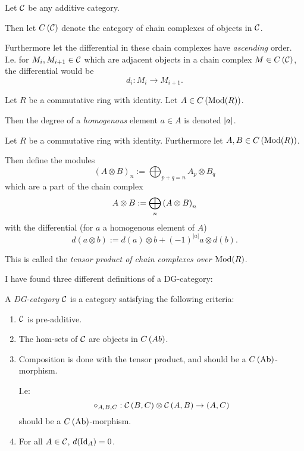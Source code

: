 \begin{notation}
    Let \( {\mathcal{C}} \) be any additive category.
    
    Then let \( C \left( {\mathcal{C}} \right) \) denote the category of chain complexes of objects in \( {\mathcal{C}} \).

    Furthermore let the differential in these chain complexes have \emph{ascending} order. I.e. for \( M_i, M_{i+1} \in {\mathcal{C}} \) which are adjacent objects in a chain complex \( M \in C \left( {\mathcal{C}} \right) \), the differential would be
    \[
        d_i : M_i \to M_{i + 1}.
    \]
\end{notation}

\begin{notation}
    Let \( R \) be a commutative ring with identity. Let \( A \in C \left( \operatorname{Mod}(R) \right) \).

    Then the degree of a \emph{homogenous} element \( a \in A \) is denoted \emph{\( \lvert a \rvert \)}.
\end{notation}

\begin{definition}
    Let \( R \) be a commutative ring with identity. Furthermore let \( A, B \in C \left( \operatorname{Mod}(R) \right) \).

    Then define the modules
    \[
        (A \otimes B)_n := \bigoplus_{p + q = n} A_p \otimes B_q
    \]
    which are a part of the chain complex
    \[
        A \otimes B := \bigoplus_n \left( A \otimes B \right)_n
    \]
    with the differential (for \( a \) a homogenous element of \( A \))
    \[
        d(a \otimes b) := d(a) \otimes b + (-1)^{|a|} a \otimes d(b).
    \]

    This is called the \emph{tensor product of chain complexes over \( \operatorname{Mod}(R) \)}.
\end{definition}

I have found three different definitions of a DG-category:

\begin{definition}
    \label{def:massey_product_in_dg_cat/what_is_a_dg_cat/dg_cat_bondal--kapranov_1991}
    A \emph{DG-category} \( {\mathcal{C}} \) is a category satisfying the following criteria:
    \begin{enumerate}
        \item \( {\mathcal{C}} \) is pre-additive.
        \item The hom-sets of \( {\mathcal{C}} \) are objects in \( C \left( Ab \right) \).
        \item{
            Composition is done with the tensor product, and should be a \( C \left( \operatorname{Ab} \right) \)-morphism.

            I.e:
            \[
                \circ_{A,B,C}: {\mathcal{C}} \left( B, C \right) \otimes {\mathcal{C}} \left( A, B \right) \to \left( A, C \right)
            \]
            should be a \( C \left( \operatorname{Ab} \right) \)-morphism.
        }
        \item For all \( A \in {\mathcal{C}} \), \( d(\operatorname{Id}_A) = 0 \).
    \end{enumerate}
\end{definition}

